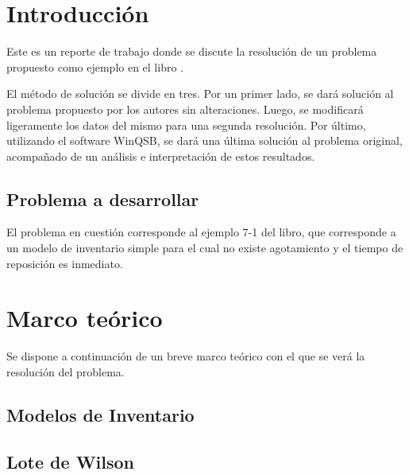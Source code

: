 \section{Introducción}
Este es un reporte de trabajo donde se discute la resolución de un problema propuesto como ejemplo en el libro \cite{acwinqsb}.

El método de solución se divide en tres. Por un primer lado, se dará solución al problema propuesto por los autores sin alteraciones. Luego, se modificará ligeramente los datos del mismo para una segunda resolución. Por último, utilizando el software WinQSB, se dará una última solución al problema original, acompañado de un análisis e interpretación de estos resultados.

\subsection{Problema a desarrollar}

El problema en cuestión corresponde al ejemplo 7-1 del libro, que corresponde a un modelo de inventario simple para el cual no existe agotamiento y el tiempo de reposición es inmediato.

\clearpage


\section{Marco teórico}
Se dispone a continuación de un breve marco teórico con el que se verá la resolución del problema.
\subsection{Modelos de Inventario}
\lipsum[1]

\subsection{Lote de Wilson}
\lipsum[2]

\clearpage
